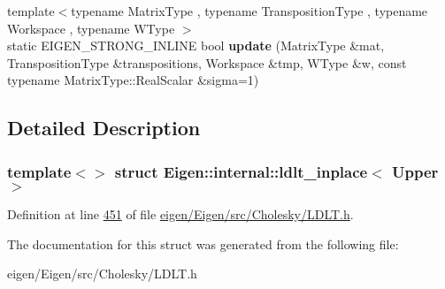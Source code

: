 \begin{DoxyCompactItemize}
\item 
\mbox{\label{struct_eigen_1_1internal_1_1ldlt__inplace_3_01_upper_01_4_ac476b25dfc49b62b8351201cb06a7708}} 
{\footnotesize template$<$typename Matrix\+Type , typename Transposition\+Type , typename Workspace , typename W\+Type $>$ }\\static E\+I\+G\+E\+N\+\_\+\+S\+T\+R\+O\+N\+G\+\_\+\+I\+N\+L\+I\+NE bool {\bfseries update} (Matrix\+Type \&mat, Transposition\+Type \&transpositions, Workspace \&tmp, W\+Type \&w, const typename Matrix\+Type\+::\+Real\+Scalar \&sigma=1)
\end{DoxyCompactItemize}


\subsection{Detailed Description}
\subsubsection*{template$<$$>$\newline
struct Eigen\+::internal\+::ldlt\+\_\+inplace$<$ Upper $>$}



Definition at line \hyperlink{eigen_2_eigen_2src_2_cholesky_2_l_d_l_t_8h_source_l00451}{451} of file \hyperlink{eigen_2_eigen_2src_2_cholesky_2_l_d_l_t_8h_source}{eigen/\+Eigen/src/\+Cholesky/\+L\+D\+L\+T.\+h}.



The documentation for this struct was generated from the following file\+:\begin{DoxyCompactItemize}
\item 
eigen/\+Eigen/src/\+Cholesky/\+L\+D\+L\+T.\+h\end{DoxyCompactItemize}
